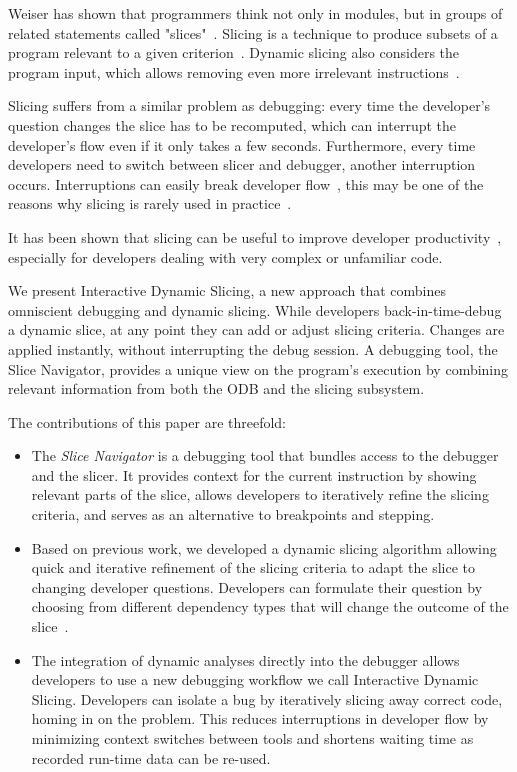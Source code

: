 \documentclass[
			english,
			review,
			]{elsarticle}
\begin{document}
Weiser has shown that programmers think not only in modules, but in groups of related statements called "slices"~\cite{weiser_programmers_1982}.
Slicing is a technique to produce subsets of a program relevant to a given criterion~\cite{weiser_program_1981}.
Dynamic slicing also considers the program input, which allows removing even more irrelevant instructions~\cite{korel_dynamic_1990, agrawal_dynamic_1990}.

Slicing suffers from a similar problem as debugging:
every time the developer's question changes the slice has to be recomputed, which can interrupt the developer's flow even if it only takes a few seconds.
Furthermore, every time developers need to switch between slicer and debugger, another interruption occurs.
Interruptions can easily break developer flow~\cite{altmann_04_task_interruption_resumption_lag}, this may be one of the reasons why slicing is rarely used in practice~\cite{perscheid_studying_2017}.

It has been shown that slicing can be useful to improve developer productivity~\cite{weiser_programmers_1982, agrawal_dynamic_1990}, especially for developers dealing with very complex or unfamiliar code.

We present Interactive Dynamic Slicing, a new approach that combines omniscient debugging and dynamic slicing.
While developers back-in-time-debug a dynamic slice, at any point they can add or adjust slicing criteria.
Changes are applied instantly, without interrupting the debug session.
A debugging tool, the Slice Navigator, provides a unique view on the program's execution by combining relevant information from both the ODB and the slicing subsystem.

The contributions of this paper are threefold:
\begin{itemize}
	\item The \emph{Slice Navigator} is a debugging tool that bundles access to the debugger and the slicer.
		It provides context for the current instruction by showing relevant parts of the slice, allows developers to iteratively refine the slicing criteria, and serves as an alternative to breakpoints and stepping.
	\item Based on previous work, we developed a dynamic slicing algorithm allowing quick and iterative refinement of the slicing criteria to adapt the slice to changing developer questions.
		Developers can formulate their question by choosing from different dependency types that will change the outcome of the slice~\cite{treffer_dynamic_2014}.
	\item The integration of dynamic analyses directly into the debugger allows developers to use a new debugging workflow we call Interactive Dynamic Slicing. Developers can isolate a bug by iteratively slicing away correct code, homing in on the problem.
	This reduces interruptions in developer flow by minimizing context switches between tools and shortens waiting time as recorded run-time data can be re-used.
\end{itemize}
\end{document}
